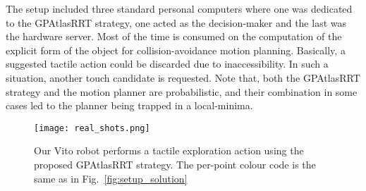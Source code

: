 The setup included three standard personal computers where one was dedicated to the GPAtlasRRT strategy, one acted as the decision-maker and the last was the hardware server. Most of the time is consumed on the computation of the explicit form of the object for collision-avoidance motion planning. Basically, a suggested tactile action could be discarded due to inaccessibility. In such a situation, another touch candidate is requested. Note that, both the GPAtlasRRT strategy and the motion planner are probabilistic, and their combination in some cases led to the planner being trapped in a local-minima.

\begin{figure}
\centering
  \texttt{[image: real\_shots.png]}
\caption{Our Vito robot performs a tactile exploration action using the proposed GPAtlasRRT strategy. The per-point colour code  is the same as in Fig.~\ref{fig:setup_solution}}
\label{fig:real}
\end{figure}